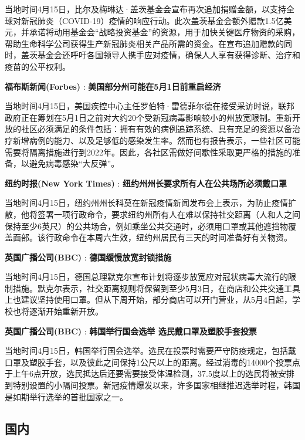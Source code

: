 \documentclass[
]{article}
\begin{document}
当地时间4月15日，比尔及梅琳达·盖茨基金会宣布再次追加捐赠金额，以支持全球对新冠肺炎（COVID-19）疫情的响应行动。此次盖茨基金会额外赠款1.5亿美元，并承诺将动用基金会``战略投资基金''的资源，用于加快关键医疗物资的采购，帮助生命科学公司获得生产新冠肺炎相关产品所需的资金。在宣布追加赠款的同时，盖茨基金会还呼吁各国领导人携手应对疫情，确保人人享有获得诊断、治疗和疫苗的公平权利。

\textbf{\textcolor{glaucous}{福布斯新闻(Forbes)}} :
\textbf{美国部分州可能在5月1日前重启经济}

当地时间4月15日，美国疾控中心主任罗伯特·雷德菲尔德在接受采访时说，联邦政府正在筹划在5月1日之前对大约20个受新冠病毒影响较小的州放宽限制。重新开放的社区必须满足的条件包括：拥有有效的病例追踪系统、具有充足的资源以备治疗新增病例的能力、以及足够低的感染发生率。然而也有报告表示，一些社区可能需要将隔离措施进行到2022年。因此，各社区需做好间歇性采取更严格的措施的准备，以避免病毒感染``大反弹''。

\textbf{\textcolor{glaucous}{纽约时报(New York Times)}} :
\textbf{纽约州州长要求所有人在公共场所必须戴口罩 }

当地时间4月15日，纽约州州长科莫在新冠疫情新闻发布会上表示，为防止疫情扩散，他将签署一项行政命令，要求纽约州所有人在难以保持社交距离（人和人之间保持至少6英尺）的公共场合，例如乘坐公共交通时，必须用口罩或其他遮挡物覆盖面部。该行政命令在本周六生效，纽约州居民有三天的时间准备好有关物资。

\textbf{\textcolor{glaucous}{英国广播公司(BBC)}} :
\textbf{德国缓慢放宽封锁措施 }

当地时间4月15日，德国总理默克尔宣布计划将逐步放宽应对冠状病毒大流行的限制措施。默克尔表示，社交距离规则将保留到至少5月3日，在商店和公共交通工具上也建议坚持使用口罩。但从下周开始，部分商店可以开门营业，从5月4日起，学校也将逐渐开始重新开放。

\textbf{\textcolor{glaucous}{英国广播公司(BBC)}} :
\textbf{韩国举行国会选举 选民戴口罩及塑胶手套投票 }

当地时间4月15日，韩国举行国会选举。选民在投票时需要严守防疫规定，包括戴口罩及塑胶手套，以及彼此之间保持1公尺以上的距离。经过消毒的14000个投票点于上午6点开放，选民抵达后还要需要接受体温检测，37.5度以上的选民将被安排到特别设置的小隔间投票。新冠疫情爆发以来，许多国家相继推迟选举时程，韩国是如期举行选举的首批国家之一。

\hypertarget{section-1}{%
\subsection{\texorpdfstring{\textcolor{glaucous}{\Large 国内}}{}}\label{section-1}}
\end{document}
